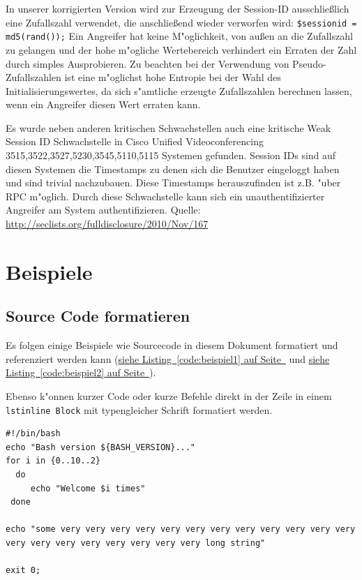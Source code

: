 \documentclass[12pt,a4paper,titlepage,oneside]{scrartcl}
\begin{document}
In unserer korrigierten Version wird zur Erzeugung der Session-ID ausschließlich eine Zufallszahl verwendet, die anschließend wieder verworfen wird: \lstinline{$sessionid = md5(rand());} Ein Angreifer hat keine M"oglichkeit, von außen an die Zufallszahl zu gelangen und der hohe m"ogliche Wertebereich verhindert ein Erraten der Zahl durch simples Ausprobieren. Zu beachten bei der Verwendung von Pseudo-Zufallszahlen ist eine m"oglichst hohe Entropie bei der Wahl des Initialisierungswertes, da sich s"amtliche erzeugte Zufallszahlen berechnen lassen, wenn ein Angreifer diesen Wert erraten kann.

Es wurde neben anderen kritischen Schwachstellen auch eine kritische Weak Session ID Schwachstelle in Cisco Unified Videoconferencing 3515,3522,3527,5230,3545,5110,5115 Systemen gefunden. Session IDs sind auf diesen Systemen die Timestamps zu denen sich die Benutzer eingeloggt haben und sind trivial nachzubauen. Diese Timestamps herauszufinden ist z.B. "uber RPC m"oglich. Durch diese Schwachstelle kann sich ein unauthentifizierter Angreifer am System authentifizieren.\newline
Quelle: \url{http://seclists.org/fulldisclosure/2010/Nov/167}

\section{Beispiele}

\subsection{Source Code formatieren}
Es folgen einige Beispiele wie Sourcecode in diesem Dokument formatiert und referenziert werden kann
(\hyperref[code:beispiel1]{siehe Listing~\ref*{code:beispiel1} auf Seite~\pageref*{code:beispiel1}} und \hyperref[code:beispiel2]{siehe Listing~\ref*{code:beispiel2} auf Seite~\pageref*{code:beispiel2}}).

Ebenso k"onnen kurzer Code oder kurze Befehle direkt in der Zeile in einem \lstinline{lstinline Block} mit typengleicher Schrift formatiert werden.

%

\begin{lstlisting}[caption=Example bash script,label=code:beispiel2,style=simple]
#!/bin/bash
echo "Bash version ${BASH_VERSION}..."
for i in {0..10..2}
  do
     echo "Welcome $i times"
 done

echo "some very very very very very very very very very very very very very very very very very very very very long string"

exit 0;
\end{lstlisting}
\end{document}
